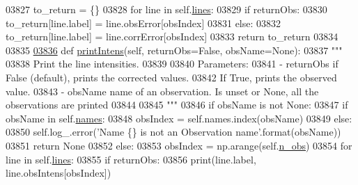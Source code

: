 \begin{DoxyCode}
{{{{{{{{{{{{{{{{{{{{{{03827         to\_return = \{\}
03828         \textcolor{keywordflow}{for} line \textcolor{keywordflow}{in} self.\hyperlink{classpyneb_1_1core_1_1pynebcore_1_1_observation_a78332043ca9f290590edf6b8a1e5b767}{lines}:
03829             \textcolor{keywordflow}{if} returnObs:
03830                 to\_return[line.label] = line.obsError[obsIndex]
03831             \textcolor{keywordflow}{else}:
03832                 to\_return[line.label] = line.corrError[obsIndex]
03833         \textcolor{keywordflow}{return} to\_return
03834     
03835     
\hypertarget{pynebcore_8py_source_l03836}{}\hyperlink{classpyneb_1_1core_1_1pynebcore_1_1_observation_aa3d4a178539eaf7fe431ef1dbd347430}{03836}     \textcolor{keyword}{def }\hyperlink{classpyneb_1_1core_1_1pynebcore_1_1_observation_aa3d4a178539eaf7fe431ef1dbd347430}{printIntens}(self, returnObs=False, obsName=None):
03837         \textcolor{stringliteral}{"""}
03838 \textcolor{stringliteral}{        Print the line intensities.}
03839 \textcolor{stringliteral}{        }
03840 \textcolor{stringliteral}{        Parameters:}
03841 \textcolor{stringliteral}{            - returnObs   if False (default), prints the corrected values. }
03842 \textcolor{stringliteral}{                            If True, prints the observed value. }
03843 \textcolor{stringliteral}{            - obsName     name of an observation. Is unset or None, all the observations are printed}
03844 \textcolor{stringliteral}{}
03845 \textcolor{stringliteral}{        """}    
03846         \textcolor{keywordflow}{if} obsName \textcolor{keywordflow}{is} \textcolor{keywordflow}{not} \textcolor{keywordtype}{None}:
03847             \textcolor{keywordflow}{if} obsName \textcolor{keywordflow}{in} self.\hyperlink{classpyneb_1_1core_1_1pynebcore_1_1_observation_a3f365d0b1488b2eba300bf71caf23c17}{names}:
03848                 obsIndex = self.names.index(obsName)
03849             \textcolor{keywordflow}{else}:
03850                 self.log\_.error(\textcolor{stringliteral}{'Name \{\} is not an Observation name'}.format(obsName))
03851                 \textcolor{keywordflow}{return} \textcolor{keywordtype}{None}
03852         \textcolor{keywordflow}{else}:
03853             obsIndex = np.arange(self.\hyperlink{classpyneb_1_1core_1_1pynebcore_1_1_observation_aef2877f7f50f5c70cee1f0da97b34081}{n\_obs})
03854         \textcolor{keywordflow}{for} line \textcolor{keywordflow}{in} self.\hyperlink{classpyneb_1_1core_1_1pynebcore_1_1_observation_a78332043ca9f290590edf6b8a1e5b767}{lines}:
03855             \textcolor{keywordflow}{if} returnObs:
03856                 print(line.label, line.obsIntens[obsIndex])
}}}}}}}}}}}}}}}}}}}}}}
\end{DoxyCode}
